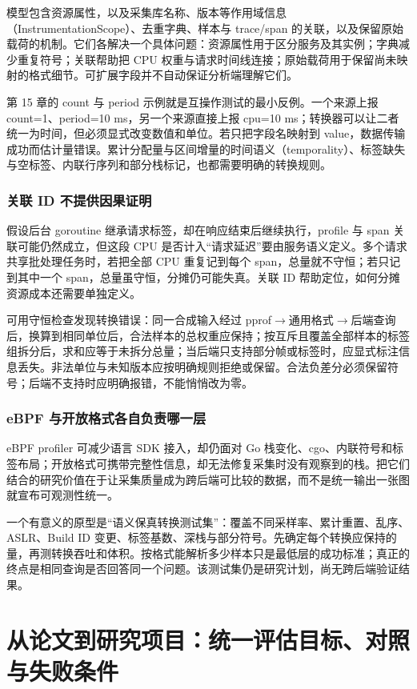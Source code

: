 \documentclass[UTF8,fontset=fandol,openany,11pt]{ctexbook}
\begin{document}
模型包含资源属性，以及采集库名称、版本等作用域信息（InstrumentationScope）、去重字典、样本与 trace/span 的关联，以及保留原始载荷的机制。它们各解决一个具体问题：资源属性用于区分服务及其实例；字典减少重复符号；关联帮助把 CPU 权重与请求时间线连接；原始载荷用于保留尚未映射的格式细节。可扩展字段并不自动保证分析端理解它们。

第 15 章的 count 与 period 示例就是互操作测试的最小反例。一个来源上报 count=1、period=10 ms，另一个来源直接上报 cpu=10 ms；转换器可以让二者统一为时间，但必须显式改变数值和单位。若只把字段名映射到 value，数据传输成功而估计量错误。累计分配量与区间增量的时间语义（temporality）、标签缺失与空标签、内联行序列和部分栈标记，也都需要明确的转换规则。

\subsubsection{关联 ID 不提供因果证明}
假设后台 goroutine 继承请求标签，却在响应结束后继续执行，profile 与 span 关联可能仍然成立，但这段 CPU 是否计入“请求延迟”要由服务语义定义。多个请求共享批处理任务时，若把全部 CPU 重复记到每个 span，总量就不守恒；若只记到其中一个 span，总量虽守恒，分摊仍可能失真。关联 ID 帮助定位，如何分摊资源成本还需要单独定义。

可用守恒检查发现转换错误：同一合成输入经过 pprof\ensuremath{\rightarrow}\allowbreak{}通用格式\ensuremath{\rightarrow}\allowbreak{}后端查询后，换算到相同单位后，合法样本的总权重应保持；按互斥且覆盖全部样本的标签组拆分后，求和应等于未拆分总量；当后端只支持部分帧或标签时，应显式标注信息丢失。非法单位与未知版本应按明确规则拒绝或保留。合法负差分必须保留符号；后端不支持时应明确报错，不能悄悄改为零。

\subsubsection{eBPF 与开放格式各自负责哪一层}
eBPF profiler 可减少语言 SDK 接入，却仍面对 Go 栈变化、cgo、内联符号和标签布局；开放格式可携带完整性信息，却无法修复采集时没有观察到的栈。把它们结合的研究价值在于让采集质量成为跨后端可比较的数据，而不是统一输出一张图就宣布可观测性统一。

一个有意义的原型是“语义保真转换测试集”：覆盖不同采样率、累计重置、乱序、ASLR、Build ID 变更、标签基数、深栈与部分符号。先确定每个转换应保持的量，再测转换吞吐和体积。按格式能解析多少样本只是最低层的成功标准；真正的终点是相同查询是否回答同一个问题。该测试集仍是研究计划，尚无跨后端验证结果。

\section{从论文到研究项目：统一评估目标、对照与失败条件}
\end{document}
